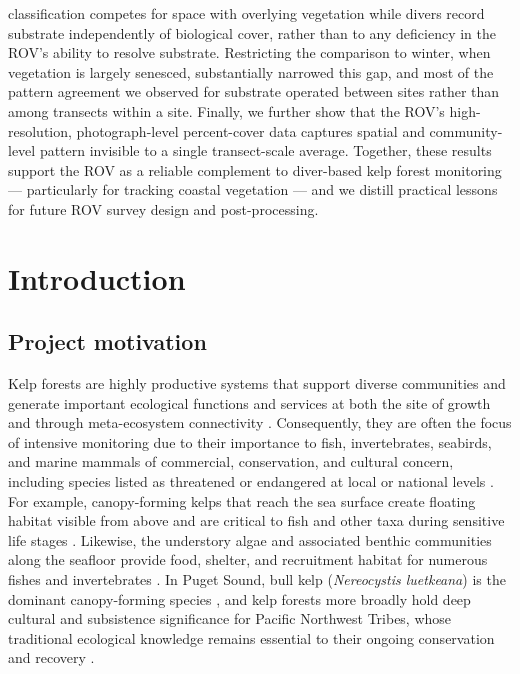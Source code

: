 \documentclass[11pt]{article}
\begin{document}
classification competes for space with overlying vegetation while divers
record substrate independently of biological cover, rather than to any
deficiency in the ROV's ability to resolve substrate.
Restricting the comparison to winter, when vegetation is largely senesced,
substantially narrowed this gap, and most of the pattern agreement we observed
for substrate operated between sites rather than among transects within a
site.
Finally, we further show that the ROV's high-resolution, photograph-level
percent-cover data captures spatial and community-level pattern invisible 
to a single transect-scale average.
Together, these results support the ROV as a reliable complement to 
diver-based kelp forest monitoring --- particularly for tracking coastal
vegetation --- and we distill practical lessons for future
ROV survey design and post-processing.

\section{Introduction}
\label{sec:intro}


\subsection{Project motivation}
\label{subsec:motivation}

Kelp forests are highly productive systems that support diverse communities and generate important ecological functions and services at both the site of growth and through meta-ecosystem connectivity \citep{Dayton1985, Schiel2015, Steneck2002, Edwards2025}.
Consequently, they are often the focus of intensive monitoring due to their importance to fish, invertebrates, seabirds, and marine mammals of commercial, conservation, and cultural concern, including species listed as threatened or endangered at local or national levels \citep{Krumhansl2016, Eger2023}.
For example, canopy-forming kelps that reach the sea surface create floating 
habitat visible from above and are critical to fish and other taxa during 
sensitive life stages \citep{Carr1991, Johnson2006}.
Likewise, the understory algae and associated benthic communities along the seafloor provide food, shelter, and recruitment habitat for numerous fishes and invertebrates \citep{Duggins1990, Teagle2017, PerezMatus2025}.
In Puget Sound, bull kelp (\textit{Nereocystis luetkeana}) is the dominant canopy-forming species \citep{Calloway:2020aa, Mumford:2007aa}, and kelp forests more broadly hold deep cultural and subsistence significance for Pacific Northwest Tribes, whose traditional ecological knowledge remains essential to their ongoing conservation and recovery \citep{Naar:2020aa}.
\end{document}
